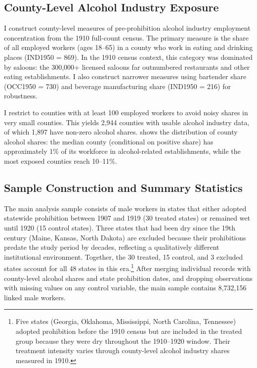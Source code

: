 \documentclass[12pt]{article}
\begin{document}
\subsection{County-Level Alcohol Industry Exposure}

I construct county-level measures of pre-prohibition alcohol industry employment concentration from the 1910 full-count census. The primary measure is the share of all employed workers (ages 18--65) in a county who work in eating and drinking places (IND1950 = 869). In the 1910 census context, this category was dominated by saloons: the 300,000+ licensed saloons far outnumbered restaurants and other eating establishments. I also construct narrower measures using bartender share (OCC1950 = 730) and beverage manufacturing share (IND1950 = 216) for robustness.

I restrict to counties with at least 100 employed workers to avoid noisy shares in very small counties. This yields 2,944 counties with usable alcohol industry data, of which 1,897 have non-zero alcohol shares.  shows the distribution of county alcohol shares: the median county (conditional on positive share) has approximately 1\% of its workforce in alcohol-related establishments, while the most exposed counties reach 10--11\%.

\subsection{Sample Construction and Summary Statistics}

The main analysis sample consists of male workers in states that either adopted statewide prohibition between 1907 and 1919 (30 treated states) or remained wet until 1920 (15 control states). Three states that had been dry since the 19th century (Maine, Kansas, North Dakota) are excluded because their prohibitions predate the study period by decades, reflecting a qualitatively different institutional environment. Together, the 30 treated, 15 control, and 3 excluded states account for all 48 states in this era.\footnote{Five states (Georgia, Oklahoma, Mississippi, North Carolina, Tennessee) adopted prohibition before the 1910 census but are included in the treated group because they were dry throughout the 1910--1920 window. Their treatment intensity varies through county-level alcohol industry shares measured in 1910.} After merging individual records with county-level alcohol shares and state prohibition dates, and dropping observations with missing values on any control variable, the main sample contains 8,732,156 linked male workers.
\end{document}
